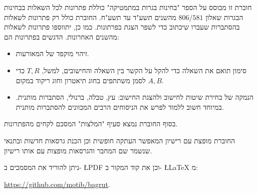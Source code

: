 חוברת זו מבוסס על הספר "בחינות בגרות במתמטיקה" כוללת פתרונות לכל השאלות בבחינות הבגרות שאלון
$806 / 581$
מהשנים תשע"ד עד תשע"ח. החוברת כולל רק פתרונות לשאלות בהסתברות שעברו שיכתוב כדי לשפר הצגת בפרתונות. כמו כן, יתווספו פתרונות לשאלות מהשנים האחרונות. הדגשים בפתרונות הם:
\begin{itemize}
\item 
זיהוי מוקפד של המאורעות.
\item
סימון תואם את השאלה כדי להקל על הקשר בין השאלה והחישובים, למשל, 
$T,R$
כדי לסמן משתתפים בחוג תיאטרון וחוג ריקוד במקום 
$A,B$.
\item
הנמקה של בחירת שיטות לחישוב ולהצגת החישוב: עץ, טבלה, ברנולי, הסתברות מותנית. במיוחד חשוב ללמוד לפרש את הניסוחים הרבים המכוונים להסתברות מותנית.
\end{itemize}
בסוף החוברת נמצא סעיף "המלצות" המסכם לקחים מהפתרונות.

החוברת מופצת עם רישיון המאפשר העתקה חופשית וכן הכנת גרסאות חדשות ובתנאי שנשמר שם המחבר והגרסאות מופצות עם אותו רישיון.

ניתן להוריד את המסמכים ב-%
\L{PDF}
וכן את קוד המקור ב-%
\L{\LaTeX{}}
מ:
\begin{center}
\url{https://github.com/motib/bagrut}.
\end{center}
